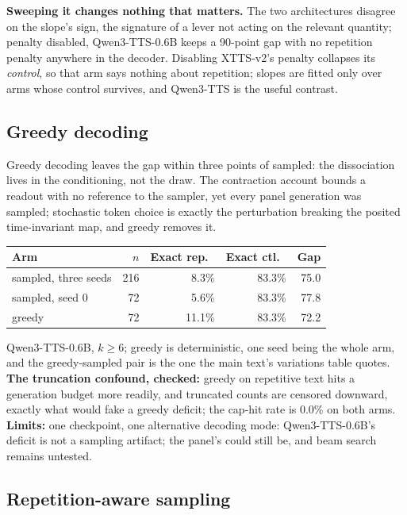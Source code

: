 \noindent\textbf{Sweeping it changes nothing that matters.} The two architectures disagree on
the slope's sign, the signature of a lever not acting on the relevant quantity; penalty
disabled, Qwen3-TTS-0.6B keeps a 90-point gap with no repetition penalty anywhere in the
decoder. Disabling XTTS-v2's penalty collapses its \emph{control}, so that arm says nothing
about repetition; slopes are fitted only over arms whose control survives, and Qwen3-TTS is the
useful contrast.

\subsection{Greedy decoding}
\label{sec:greedy}

Greedy decoding leaves the gap within three points of sampled: the dissociation lives in the
conditioning, not the draw. The contraction account bounds a readout with no reference to the
sampler, yet every panel generation was sampled; stochastic token choice is exactly the
perturbation breaking the posited time-invariant map, and greedy removes it.

\begin{center}
\begin{tabular}{@{}lrrrr@{}}
\toprule
Arm & $n$ & Exact rep.\ & Exact ctl.\ & Gap \\
\midrule
sampled, three seeds & 216 & 8.3\%  & 83.3\% & 75.0 \\
sampled, seed 0      &  72 & 5.6\%  & 83.3\% & 77.8 \\
greedy               &  72 & 11.1\% & 83.3\% & 72.2 \\
\bottomrule
\end{tabular}
\end{center}

\noindent Qwen3-TTS-0.6B, $k\ge6$; greedy is deterministic, one seed being the whole arm, and
the greedy-sampled pair is the one the main text's variations table quotes. \textbf{The
truncation confound, checked:} greedy on repetitive text hits a generation budget more readily,
and truncated counts are censored downward, exactly what would fake a greedy deficit; the
cap-hit rate is 0.0\% on both arms. \textbf{Limits:} one checkpoint, one alternative decoding
mode: Qwen3-TTS-0.6B's deficit is not a sampling artifact; the panel's could still be, and beam
search remains untested.

\subsection{Repetition-aware sampling}
\label{sec:ras}

